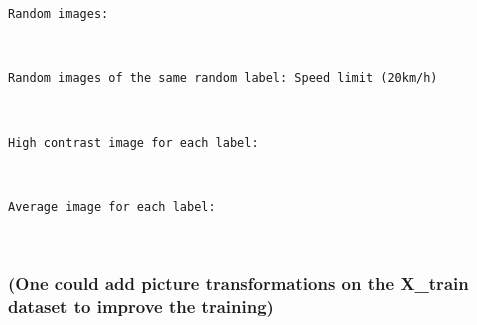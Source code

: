 \documentclass[11pt]{article}
\begin{document}
    \begin{Verbatim}[commandchars=\\\{\}]
Random images:

    \end{Verbatim}

    \begin{center}
    \end{center}
    { \hspace*{\fill} \\}
    
    \begin{Verbatim}[commandchars=\\\{\}]
Random images of the same random label: Speed limit (20km/h)

    \end{Verbatim}

    \begin{center}
    \end{center}
    { \hspace*{\fill} \\}
    
    \begin{Verbatim}[commandchars=\\\{\}]
High contrast image for each label:

    \end{Verbatim}

    \begin{center}
    \end{center}
    { \hspace*{\fill} \\}
    
    \begin{Verbatim}[commandchars=\\\{\}]
Average image for each label:

    \end{Verbatim}

    \begin{center}
    \end{center}
    { \hspace*{\fill} \\}
    
    \subsubsection{(One could add picture transformations on the X\_train
dataset to improve the
training)}\label{one-could-add-picture-transformations-on-the-x_train-dataset-to-improve-the-training}
\end{document}
